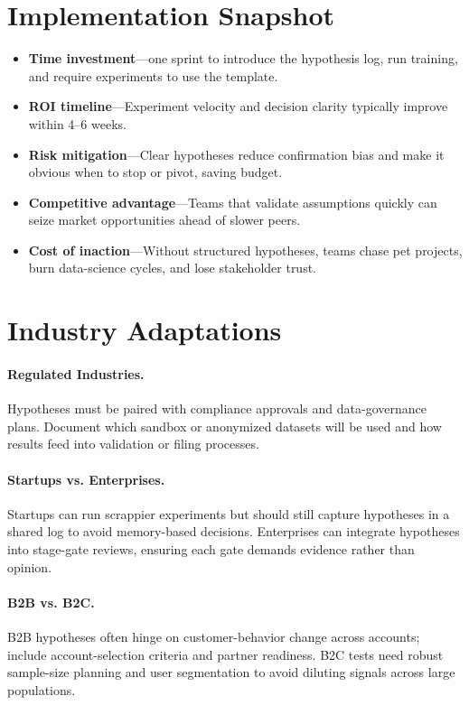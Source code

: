 \section{Implementation Snapshot}
\label{sec:hypothesis-snapshot}
\begin{itemize}
    \item \textbf{Time investment}—one sprint to introduce the hypothesis log, run training, and require experiments to use the template.
    \item \textbf{ROI timeline}—Experiment velocity and decision clarity typically improve within 4--6 weeks.
    \item \textbf{Risk mitigation}—Clear hypotheses reduce confirmation bias and make it obvious when to stop or pivot, saving budget.
    \item \textbf{Competitive advantage}—Teams that validate assumptions quickly can seize market opportunities ahead of slower peers.
    \item \textbf{Cost of inaction}—Without structured hypotheses, teams chase pet projects, burn data-science cycles, and lose stakeholder trust.
\end{itemize}
\section{Industry Adaptations}
\label{sec:hypotheses-industry}
\paragraph{Regulated Industries.} Hypotheses must be paired with compliance approvals and data-governance plans. Document which sandbox or anonymized datasets will be used and how results feed into validation or filing processes.

\paragraph{Startups vs. Enterprises.} Startups can run scrappier experiments but should still capture hypotheses in a shared log to avoid memory-based decisions. Enterprises can integrate hypotheses into stage-gate reviews, ensuring each gate demands evidence rather than opinion.

\paragraph{B2B vs. B2C.} B2B hypotheses often hinge on customer-behavior change across accounts; include account-selection criteria and partner readiness. B2C tests need robust sample-size planning and user segmentation to avoid diluting signals across large populations.

